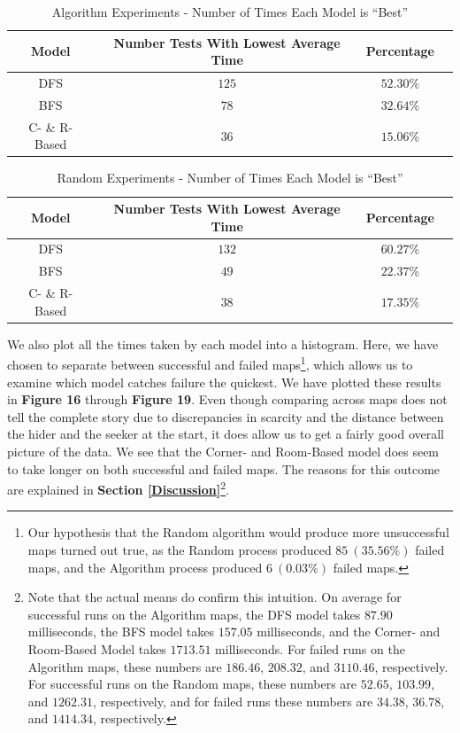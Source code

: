 \documentclass[12pt]{article}
\begin{document}
\begin{table}
\caption{Algorithm Experiments - Number of Times Each Model is ``Best''}
\centering
\begin{tabular}{|c|c|c|l|} \hline
Model&Number Tests With Lowest Average Time&Percentage\\ \hline
DFS&$ 125 $&$ 52.30\% $\\ \hline
BFS&$ 78 $&$ 32.64\% $\\ \hline
C- \& R-Based&$ 36 $&$ 15.06\% $\\ \hline
\end{tabular}
\end{table}

\begin{table}
\caption{Random Experiments - Number of Times Each Model is ``Best''}
\centering
\begin{tabular}{|c|c|c|l|} \hline
Model&Number Tests With Lowest Average Time&Percentage\\ \hline
DFS&$ 132 $&$ 60.27\% $\\ \hline
BFS&$ 49 $&$ 22.37\% $\\ \hline
C- \& R-Based&$ 38 $&$ 17.35\% $\\ \hline
\end{tabular}
\end{table}

We also plot all the times taken by each model into a histogram. Here, we have chosen to separate between successful and failed maps\footnote{Our hypothesis that the Random algorithm would produce more unsuccessful maps turned out true, as the Random process produced $ 85 \ (35.56\%) $ failed maps, and the Algorithm process produced $ 6 \ (0.03\%) $ failed maps.}, which allows us to examine which model catches failure the quickest. We have plotted these results in \textbf{Figure 16} through \textbf{Figure 19}. Even though comparing across maps does not tell the complete story due to discrepancies in scarcity and the distance between the hider and the seeker at the start, it does allow us to get a fairly good overall picture of the data. We see that the Corner- and Room-Based model does seem to take longer on both successful and failed maps. The reasons for this outcome are explained in \textbf{Section \ref{Discussion}}\footnote{Note that the actual means do confirm this intuition. On average for successful runs on the Algorithm maps, the DFS model takes $ 87.90 $ milliseconds, the BFS model takes $ 157.05 $ milliseconds, and the Corner- and Room-Based Model takes $ 1713.51 $ milliseconds. For failed runs on the Algorithm maps, these numbers are $ 186.46 $, $ 208.32 $, and $ 3110.46 $, respectively. For successful runs on the Random maps, these numbers are $ 52.65 $, $ 103.99 $, and $ 1262.31 $, respectively, and for failed runs these numbers are $ 34.38 $, $ 36.78 $, and $ 1414.34 $, respectively.}.
\end{document}
